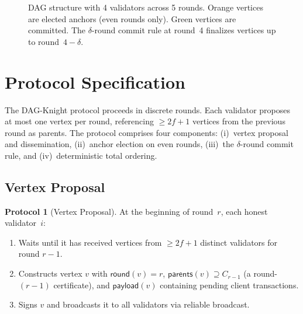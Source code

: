\documentclass[11pt,a4paper]{article}
\theoremstyle{definition}
\newtheorem{protocol}[theorem]{Protocol}
\theoremstyle{remark}
\newcommand{\DK}{\textsf{DAG-Knight}}
\newcommand{\round}{\mathsf{round}}
\begin{document}
\begin{figure}[t]
\caption{DAG structure with 4 validators across 5 rounds.
Orange vertices are elected anchors (even rounds only).
Green vertices are committed.
The $\delta$-round commit rule at round~4 finalizes vertices up to round~$4 - \delta$.}
\label{fig:dag-structure}
\end{figure}

\section{Protocol Specification}\label{sec:protocol}

The \DK{} protocol proceeds in discrete rounds.
Each validator proposes at most one vertex per round, referencing $\geq 2f+1$
vertices from the previous round as parents.
The protocol comprises four components: (i)~vertex proposal and
dissemination, (ii)~anchor election on even rounds, (iii)~the $\delta$-round
commit rule, and (iv)~deterministic total ordering.

\subsection{Vertex Proposal}\label{sec:vertex-proposal}

\begin{protocol}[Vertex Proposal]\label{prot:proposal}
At the beginning of round~$r$, each honest validator~$i$:
\begin{enumerate}[nosep]
  \item Waits until it has received vertices from $\geq 2f+1$ distinct
    validators for round $r-1$.
  \item Constructs vertex $v$ with $\round(v) = r$,
    $\mathsf{parents}(v) \supseteq C_{r-1}$ (a round-$(r\!-\!1)$ certificate),
    and $\mathsf{payload}(v)$ containing pending client transactions.
  \item Signs $v$ and broadcasts it to all validators via reliable broadcast.
\end{enumerate}
\end{protocol}
\end{document}
